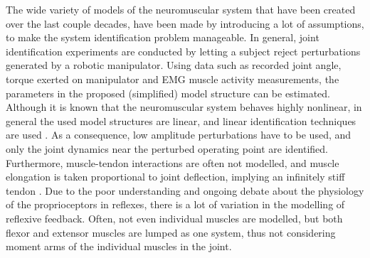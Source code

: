 The wide variety of models of the neuromuscular system that have been created over the last couple decades, have been made by introducing a lot of assumptions, to make the system identification problem manageable. In general, joint identification experiments are conducted by letting a subject reject perturbations generated by a robotic manipulator. Using data such as recorded joint angle, torque exerted on manipulator and EMG muscle activity measurements, the parameters in the proposed (simplified) model structure can be estimated. Although it is known that the neuromuscular system behaves highly nonlinear, in general the used model structures are linear, and linear identification techniques are used \cite{van_der_helm_identification_2002, schouten_nmclab_2008, mugge_rigorous_2010}. As a consequence, low amplitude perturbations have to be used, and only the joint dynamics near the perturbed operating point are identified. Furthermore, muscle-tendon interactions are often not modelled, and muscle elongation is taken proportional to joint deflection, implying an infinitely stiff tendon \cite{zhang_simultaneous_1997, mirbagheri_intrinsic_2000, van_der_helm_identification_2002}. Due to the poor understanding and ongoing debate about the physiology of the proprioceptors in reflexes, there is a lot of variation in the modelling of reflexive feedback. Often, not even individual muscles are modelled, but both flexor and extensor muscles are lumped as one system, thus not considering moment arms of the individual muscles in the joint. 

